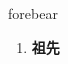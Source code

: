 
\begin{frame}
{\huge forebear}
\begin{center}
\begin{enumerate}\Large
  \item \textbf{祖先}
\end{enumerate}
\end{center}
\end{frame}
